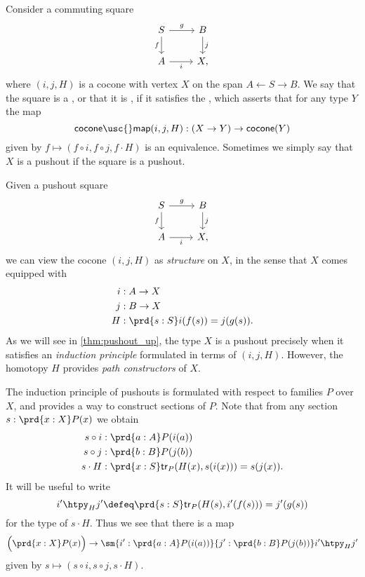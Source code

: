 \begin{defn}
Consider a commuting square
\begin{equation*}
\begin{tikzcd}
S \arrow[r,"g"] \arrow[d,swap,"f"] & B \arrow[d,"j"] \\
A \arrow[r,swap,"i"] & X,
\end{tikzcd}
\end{equation*}
where $(i,j,H)$ is a cocone with vertex $X$ on the span $A \leftarrow S \rightarrow B$.
We say that the square is a , or that it is , if it satisfies the , which asserts that for any type $Y$ the map
\begin{equation*}
\mathsf{cocone\usc{}map}(i,j,H):(X\to Y)\to \mathsf{cocone}(Y)
\end{equation*}
given by $f\mapsto (f\circ i,f\circ j,f\cdot H)$ is an equivalence. Sometimes we simply say that $X$ is a pushout if the square is a pushout.
\end{defn}

\begin{rmk}
Given a pushout square
\begin{equation*}
\begin{tikzcd}
S \arrow[r,"g"] \arrow[d,swap,"f"] & B \arrow[d,"j"] \\
A \arrow[r,swap,"i"] & X,
\end{tikzcd}
\end{equation*}
we can view the cocone $(i,j,H)$ as \emph{structure} on $X$, in the sense that $X$ comes equipped with
\begin{align*}
i & : A\to X \\
j & : B\to X \\
H & : \prd{s:S} i(f(s))=j(g(s)).
\end{align*}
As we will see in \cref{thm:pushout_up}, the type $X$ is a pushout precisely when it satisfies an \emph{induction principle} formulated in terms of $(i,j,H)$. However, the homotopy $H$ provides \emph{path constructors} of $X$. 

The induction principle of pushouts is formulated with respect to families $P$ over $X$, and provides a way to construct sections of $P$. Note that from any section $s:\prd{x:X}P(x)$ we obtain
\begin{align*}
s\circ i & : \prd{a:A}P(i(a)) \\
s\circ j & : \prd{b:B}P(j(b)) \\
s\cdot H & : \prd{x:S}\mathsf{tr}_P(H(x),s(i(x)))=s(j(x)).
\end{align*}
It will be useful to write
\begin{equation*}
i' \htpy_H j' \defeq \prd{s:S} \mathsf{tr}_P(H(s),i'(f(s)))=j'(g(s))
\end{equation*}
for the type of $s\cdot H$. Thus we see that there is a map
\begin{equation*}
\Big(\prd{x:X}P(x)\Big)\to \sm{i':\prd{a:A}P(i(a))}{j':\prd{b:B}P(j(b))} i'\htpy_H j'
\end{equation*}
given by $s\mapsto (s\circ i,s\circ j,s\cdot H)$.
\end{rmk}

